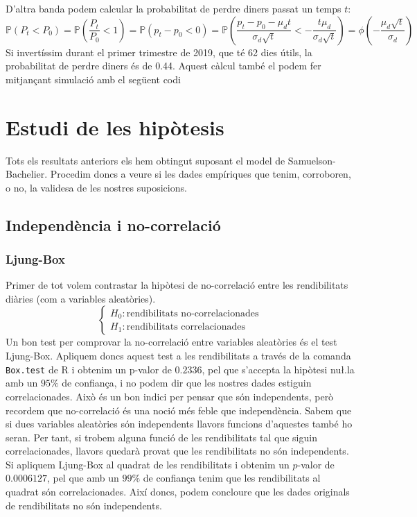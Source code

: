 \documentclass{article}
\numberwithin{table}{section}
\numberwithin{figure}{section}
\numberwithin{equation}{section}
\renewcommand{\P}{\ensuremath{\mathbb{P}}}
\begin{document}
D'altra banda podem calcular la probabilitat de perdre diners passat un temps \( t \):
\begin{equation*}
	\P(P_t < P_0) = \P\left(\frac{P_t}{P_0} < 1\right) = \P(p_t - p_0 < 0) = \P\left(\frac{p_t - p_0 - \mu_d t}{\sigma_d\sqrt{t}} < -\frac{t\mu_d}{\sigma_d\sqrt{t}}\right) = \phi\left(-\frac{\mu_d \sqrt{t}}{\sigma_d}\right)
\end{equation*}
Si invertíssim durant el primer trimestre de 2019, que té 62 dies útils, la probabilitat de perdre diners és de \num{0.44}. Aquest càlcul també el podem fer mitjançant simulació amb el següent codi


\section{Estudi de les hipòtesis}
Tots els resultats anteriors els hem obtingut suposant el model de Samuelson-Bachelier. Procedim doncs a veure si les dades empíriques que tenim, corroboren, o no, la validesa de les nostres suposicions.

\subsection{Independència i no-correlació}%
\subsubsection{Ljung-Box}
Primer de tot volem contrastar la hipòtesi de no-correlació entre les rendibilitats diàries (com a variables aleatòries).
\begin{equation}
  \begin{cases}
    H_0: \text{rendibilitats no-correlacionades}\\
    H_1: \text{rendibilitats correlacionades}
  \end{cases}
\end{equation}
Un bon test per comprovar la no-correlació entre variables aleatòries és el test Ljung-Box. Apliquem doncs aquest test a les rendibilitats a través de la comanda \texttt{Box.test} de \textsf{R} i obtenim un p-valor de $0.2336$, pel que s'accepta la hipòtesi nu\l.la amb un $95\%$ de confiança, i no podem dir que les nostres dades estiguin correlacionades. Això és un bon indici per pensar que són independents, però recordem que no-correlació és una noció més feble que independència. Sabem que si dues variables aleatòries són independents llavors funcions d’aquestes també ho seran. Per tant, si trobem alguna funció de les rendibilitats tal que siguin correlacionades, llavors quedarà provat que les rendibilitats no són independents. Si apliquem Ljung-Box al quadrat de les rendibilitats i obtenim un \( p \)-valor de $0.0006127$, pel que amb un $99\%$ de confiança tenim que les rendibilitats al quadrat són correlacionades. Així doncs, podem concloure que les dades originals de rendibilitats no són independents. 
\end{document}
